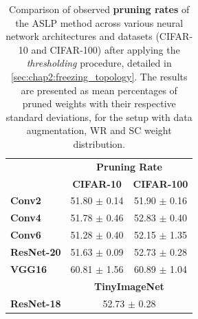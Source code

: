 \begin{table}[htbp]
  \centering\begin{tabular}{lcc}
    \cmidrule[\heavyrulewidth]{2-3}
    & \multicolumn{2}{c}{\textbf{Pruning Rate}}\\
    & \textbf{CIFAR-10} & \textbf{CIFAR-100}\\
    \toprule
    \textbf{Conv2} & 51.80 $\pm$ 0.14 & 51.90 $\pm$ 0.16\\
    \textbf{Conv4} & 51.78 $\pm$ 0.46 & 52.83 $\pm$ 0.40\\
    \textbf{Conv6} & 51.28 $\pm$ 0.40 & 52.15 $\pm$ 1.35\\
    \textbf{ResNet-20} & 51.63 $\pm$ 0.09 & 52.73 $\pm$ 0.28\\
    \textbf{VGG16} & 60.81 $\pm$ 1.56 & 60.89 $\pm$ 1.04\\
    \midrule
    & \multicolumn{2}{c}{\textbf{TinyImageNet}} \\
    \textbf{ResNet-18} & \multicolumn{2}{c}{52.73 $\pm$ 0.28}\\
    \bottomrule
    \end{tabular}
  \caption{Comparison of observed \textbf{pruning rates} of the \ac{ASLP} method
    across various neural network architectures and datasets (CIFAR-10 and
    CIFAR-100) after applying the \emph{thresholding} procedure, detailed in
    \cref{sec:chap2:freezing_topology}. The results are presented as mean
    percentages of pruned weights with their respective standard deviations, for
    the setup with data augmentation, \acf{WR} and \acf{SC} weight
    distribution.}
  \label{tab:chap2:observed_sparsity}
\end{table}



